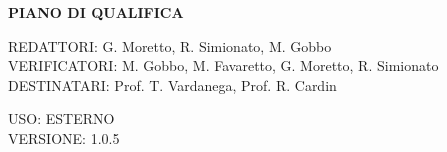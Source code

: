 \documentclass[5pt]{article}
\begin{document}
	\vspace{24pt}
	
	\begin{center}
		\textbf{\LARGE PIANO DI QUALIFICA}
	\end{center}
	
	\vspace{13pt}
	
	\begin{flushleft}
		\begin{spacing}{1.5}
			REDATTORI: G. Moretto, R. Simionato, M. Gobbo\\%
			VERIFICATORI: M. Gobbo, M. Favaretto, G. Moretto, R. Simionato\\
			\vspace{7pt}
			DESTINATARI: Prof. T. Vardanega, Prof. R. Cardin\\%
		\end{spacing}
	\end{flushleft}
	
	\begin{flushright}
		\begin{spacing}{1}
			USO: ESTERNO\\
			VERSIONE: 1.0.5\\
		\end{spacing}
	\end{flushright}
	
	
	\restoregeometry
	
	\pagebreak
	
\end{document}
